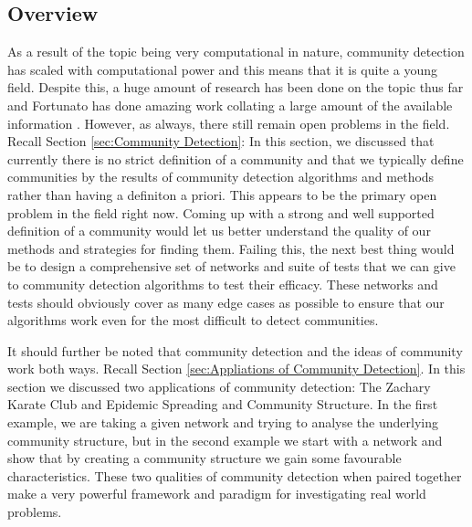 \subsection{Overview}
As a result of the topic being very computational in nature, community detection has scaled with computational power and this means that it is quite a young field. Despite this, a huge amount of research has been done on the topic thus far and Fortunato has done amazing work collating a large amount of the available information \cite{fortunato}. However, as always, there still remain open problems in the field. Recall Section \ref{sec:Community Detection}: In this section, we discussed that currently there is no strict definition of a community and that we typically define communities by the results of community detection algorithms and methods rather than having a definiton a priori. This appears to be the primary open problem in the field right now. Coming up with a strong and well supported definition of a community would let us better understand the quality of our methods and strategies for finding them. Failing this, the next best thing would be to design a comprehensive set of networks and suite of tests that we can give to community detection algorithms to test their efficacy. These networks and tests should obviously cover as many edge cases as possible to ensure that our algorithms work even for the most difficult to detect communities. 

It should further be noted that community detection and the ideas of community work both ways. Recall Section \ref{sec:Appliations of Community Detection}. In this section we discussed two applications of community detection: The Zachary Karate Club and Epidemic Spreading and Community Structure. In the first example, we are taking a given network and trying to analyse the underlying community structure, but in the second example we start with a network and show that by creating a community structure we gain some favourable characteristics. These two qualities of community detection when paired together make a very powerful framework and paradigm for investigating real world problems.


